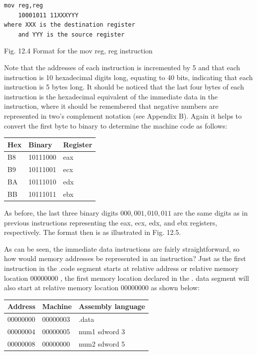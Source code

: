\documentclass[10pt]{book}
\begin{document}
\begin{verbatim}
mov reg,reg
    10001011 11XXXYYY
where XXX is the destination register
    and YYY is the source register
\end{verbatim}

Fig. 12.4 Format for the mov reg, reg instruction

Note that the addresses of each instruction is incremented by 5 and that each instruction is 10 hexadecimal digits long, equating to 40 bits, indicating that each instruction is 5 bytes long. It should be noticed that the last four bytes of each instruction is the hexadecimal equivalent of the immediate data in the instruction, where it should be remembered that negative numbers are represented in two's complement notation (see Appendix B). Again it helps to convert the first byte to binary to determine the machine code as follows:

\begin{center}
\begin{tabular}{|l|l|l|}
\hline
Hex & Binary & Register \\
\hline
B8 & 10111000 & eax \\
\hline
B9 & 10111001 & ecx \\
\hline
BA & 10111010 & edx \\
\hline
BB & 10111011 & ebx \\
\hline
\end{tabular}
\end{center}

As before, the last three binary digits $000,001,010,011$ are the same digits as in previous instructions representing the eax, ecx, edx, and ebx registers, respectively. The format then is as illustrated in Fig. 12.5.

As can be seen, the immediate data instructions are fairly straightforward, so how would memory addresses be represented in an instruction? Just as the first instruction in the .code segment starts at relative address or relative memory location 00000000 , the first memory location declared in the . data segment will also start at relative memory location 00000000 as shown below:

\begin{center}
\begin{tabular}{|l|l|l|}
\hline
Address & Machine & Assembly language \\
\hline\hline
00000000 & 00000003 & .data \\
\hline
00000004 & 00000005 & num1 sdword 3 \\
\hline
00000008 & 00000000 & num2 sdword 5 \\
\hline
\end{tabular}
\end{center}
\end{document}
